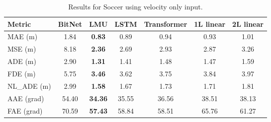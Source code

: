 \begin{table}[H]
\centering
\caption{Results for Soccer using velocity only input.}
\label{vel:SOC1}
\begin{tabular}{l||c|c|c|c|c|c}
Metric & BitNet & LMU & LSTM & Transformer & 1L linear & 2L linear \\
\hline \hline
MAE (m) & 1.84 & \textbf{0.83} & 0.89  & 0.94 & 0.93 & 1.01 \\
MSE (m) & 8.18 & \textbf{2.36} & 2.69 & 2.93 & 2.87 & 3.26 \\
ADE (m) & 2.90 & \textbf{1.31} & 1.41 & 1.48 & 1.47 & 1.59 \\
FDE (m) & 5.75 & \textbf{3.46} & 3.62 & 3.75 & 3.84 & 3.97  \\
NL\_ADE (m) & 2.99 & \textbf{1.58} & 1.67 & 1.73 & 1.71 & 1.81 \\
AAE (grad) & 54.40 & \textbf{34.36} & 35.55& 36.56  & 38.51  & 38.13 \\
FAE (grad) & 70.59 & \textbf{57.43} & 58.84 & 58.51 & 65.76 & 61.27 \\
\end{tabular}
\end{table}